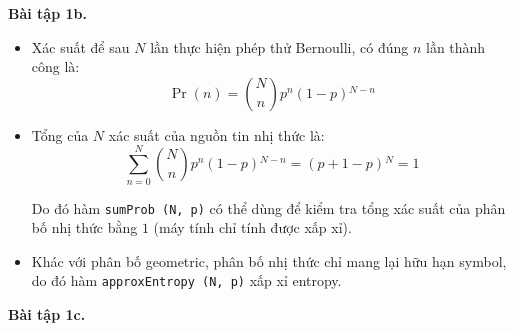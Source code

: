 \documentclass{article}
\begin{document}
\newpage

\par\textbf{Bài tập 1b.}

\begin{itemize}
    \item Xác suất để sau $N$ lần thực hiện phép thử Bernoulli, có đúng $n$ lần thành công là:
        \[ \Pr(n) = \binom{N}{n}p^{n}(1-p){}^{N-n} \]
    \item Tổng của $N$ xác suất của nguồn tin nhị thức là:
        \[
            \sum^{N}_{n=0}\binom{N}{n}p^{n}(1-p){}^{N-n} = (p + 1- p){}^{N} = 1
        \]
        \par Do đó hàm \texttt{sumProb (N, p)} có thể dùng để kiểm tra tổng xác suất của phân bố nhị thức bằng $1$ (máy tính chỉ tính được xấp xỉ).
    \item Khác với phân bố geometric, phân bố nhị thức chỉ mang lại hữu hạn symbol, do đó hàm \texttt{approxEntropy (N, p)} xấp xỉ entropy.
\end{itemize}

\newpage

\par\textbf{Bài tập 1c.}
\end{document}
